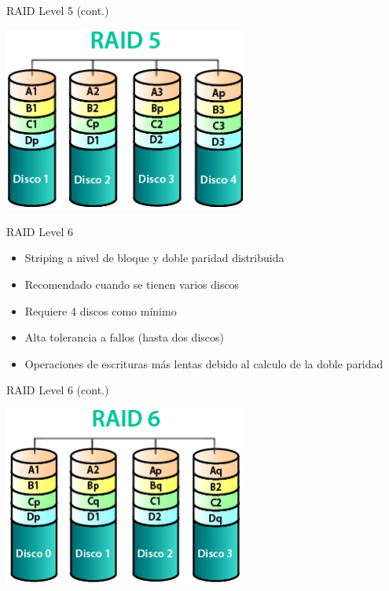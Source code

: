 \begin{frame}{RAID Level 5 (cont.)}
 \begin{center}
  \includegraphics[width=0.6\textwidth]{images/raid5.png}
 \end{center}
\end{frame}

\begin{frame}{RAID Level 6}
 \begin{itemize}
  \item Striping a nivel de bloque y doble paridad distribuida
  \item Recomendado cuando se tienen varios discos
  \item Requiere 4 discos como mínimo
  \item Alta tolerancia a fallos (hasta dos discos)
  \item Operaciones de escrituras más lentas debido al calculo de la doble paridad
 \end{itemize}
\end{frame}

\begin{frame}{RAID Level 6 (cont.)}
 \begin{center}
  \includegraphics[width=0.6\textwidth]{images/raid6.png}
 \end{center}
\end{frame}

